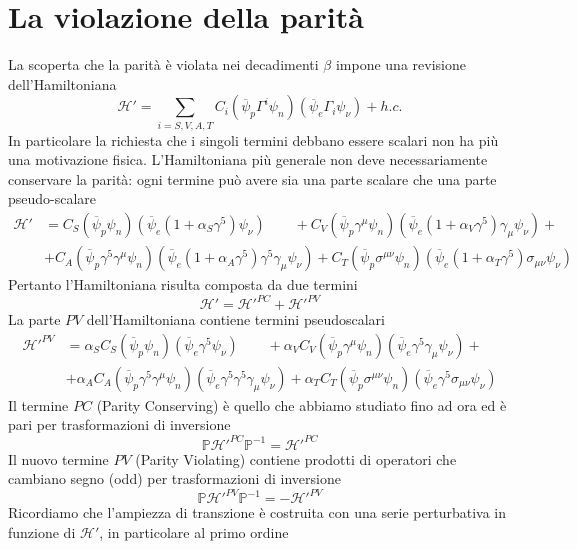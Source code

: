 \section{La violazione della parità}
La scoperta che la parità è violata nei decadimenti $\beta$ impone una revisione dell'Hamiltoniana
$$
\mathcal{H}' = \sum_{i=S,V,A,T} C_i (\overline{\psi}_p \Gamma^i \psi_n) (\overline{\psi}_e \Gamma_i \psi_\nu) + h.c.
$$
In particolare la richiesta che i singoli termini debbano essere scalari non ha più una motivazione fisica. L'Hamiltoniana più generale non deve necessariamente conservare la parità: ogni termine può avere sia una parte scalare che una parte pseudo-scalare
$$
\begin{aligned}
	\mathcal{H}' &= C_S (\overline{\psi}_p \psi_n) (\overline{\psi}_e (1 + \alpha_S \gamma^5) \psi_\nu) \qquad + C_V (\overline{\psi}_p \gamma^\mu \psi_n) (\overline{\psi}_e (1 + \alpha_V \gamma^5) \gamma_\mu \psi_\nu) + \\
	&+ C_A (\overline{\psi}_p \gamma^5 \gamma^\mu \psi_n) (\overline{\psi}_e (1 + \alpha_A \gamma^5) \gamma^5 \gamma_\mu \psi_\nu) + C_T (\overline{\psi}_p \sigma^{\mu\nu} \psi_n) (\overline{\psi}_e (1 + \alpha_T \gamma^5) \sigma_{\mu\nu} \psi_\nu)
\end{aligned}
$$
Pertanto l'Hamiltoniana risulta composta da due termini
$$
\mathcal{H}' = \mathcal{H}'^{PC} + \mathcal{H}'^{PV}
$$
La parte $PV$ dell'Hamiltoniana contiene termini pseudoscalari
$$
\begin{aligned}
	\mathcal{H}'^{PV} &= \alpha_S C_S (\overline{\psi}_p \psi_n) (\overline{\psi}_e \gamma^5 \psi_\nu) \qquad + \alpha_V C_V (\overline{\psi}_p \gamma^\mu \psi_n) (\overline{\psi}_e \gamma^5 \gamma_\mu \psi_\nu) + \\
	&+ \alpha_A C_A (\overline{\psi}_p \gamma^5 \gamma^\mu \psi_n) (\overline{\psi}_e \gamma^5 \gamma^5 \gamma_\mu \psi_\nu) + \alpha_T C_T (\overline{\psi}_p \sigma^{\mu\nu} \psi_n) (\overline{\psi}_e \gamma^5 \sigma_{\mu\nu} \psi_\nu)
\end{aligned}
$$
Il termine $PC$ (Parity Conserving) è quello che abbiamo studiato fino ad ora ed è pari per trasformazioni di inversione
$$
\mathbb{P}\mathcal{H}'^{PC}\mathbb{P}^{-1} = \mathcal{H}'^{PC}
$$
Il nuovo termine $PV$ (Parity Violating) contiene prodotti di operatori che cambiano segno (odd) per trasformazioni di inversione
$$
\mathbb{P}\mathcal{H}'^{PV}\mathbb{P}^{-1} = -\mathcal{H}'^{PV}
$$
Ricordiamo che l'ampiezza di transzione è costruita con una serie perturbativa in funzione di $\mathcal{H}'$, in particolare al primo ordine
